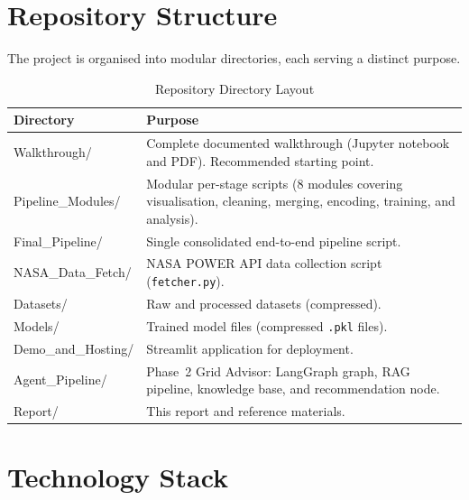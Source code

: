 \documentclass[12pt, a4paper]{article}
\begin{document}

\newpage
\section{Repository Structure}

The project is organised into modular directories, each serving a distinct purpose.

\begin{table}[H]
    \centering
    \caption{Repository Directory Layout}
    \begin{tabularx}{\textwidth}{lX}
        \toprule
        \textbf{Directory} & \textbf{Purpose} \\
        \midrule
        Walkthrough/ & Complete documented walkthrough (Jupyter notebook and PDF). Recommended starting point. \\
        Pipeline\_Modules/ & Modular per-stage scripts (8 modules covering visualisation, cleaning, merging, encoding, training, and analysis). \\
        Final\_Pipeline/ & Single consolidated end-to-end pipeline script. \\
        NASA\_Data\_Fetch/ & NASA POWER API data collection script (\texttt{fetcher.py}). \\
        Datasets/ & Raw and processed datasets (compressed). \\
        Models/ & Trained model files (compressed \texttt{.pkl} files). \\
        Demo\_and\_Hosting/ & Streamlit application for deployment. \\
        Agent\_Pipeline/ & Phase~2 Grid Advisor: LangGraph graph, RAG pipeline, knowledge base, and recommendation node. \\
        Report/ & This report and reference materials. \\
        \bottomrule
    \end{tabularx}
\end{table}

\section{Technology Stack}
\end{document}
